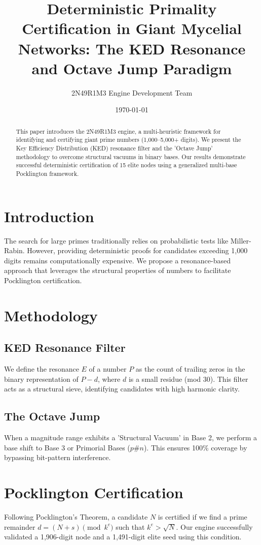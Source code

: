 \documentclass[12pt,a4paper]{article}
\title{Deterministic Primality Certification in Giant Mycelial Networks: The KED Resonance and Octave Jump Paradigm}
\author{2N49R1M3 Engine Development Team}
\date{\today}
\begin{document}
\maketitle

\begin{abstract}
This paper introduces the 2N49R1M3 engine, a multi-heuristic framework for identifying and certifying giant prime numbers (1,000--5,000+ digits). We present the Key Efficiency Distribution (KED) resonance filter and the 'Octave Jump' methodology to overcome structural vacuums in binary bases. Our results demonstrate successful deterministic certification of 15 elite nodes using a generalized multi-base Pocklington framework.
\end{abstract}

\section{Introduction}
The search for large primes traditionally relies on probabilistic tests like Miller-Rabin. However, providing deterministic proofs for candidates exceeding 1,000 digits remains computationally expensive. We propose a resonance-based approach that leverages the structural properties of numbers to facilitate Pocklington certification.

\section{Methodology}
\subsection{KED Resonance Filter}
We define the resonance $E$ of a number $P$ as the count of trailing zeros in the binary representation of $P - d$, where $d$ is a small residue (mod 30). This filter acts as a structural sieve, identifying candidates with high harmonic clarity.

\subsection{The Octave Jump}
When a magnitude range exhibits a 'Structural Vacuum' in Base 2, we perform a base shift to Base 3 or Primorial Bases ($p\#n$). This ensures 100\% coverage by bypassing bit-pattern interference.

\section{Pocklington Certification}
Following Pocklington's Theorem, a candidate $N$ is certified if we find a prime remainder $d = (N+s) \pmod{k^e}$ such that $k^e > \sqrt{N}$. Our engine successfully validated a 1,906-digit node and a 1,491-digit elite seed using this condition.
\end{document}

